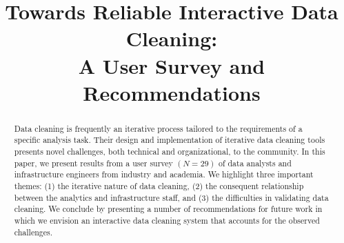 \documentclass{sig-alternate-05-2015}
\begin{document}
\newtheorem{theorem}{Theorem}
\newtheorem{example}{Example}
\newtheorem{definition}{Definition}
\newtheorem{problem}{Problem}
\newtheorem{property}{Property}
\newtheorem{proposition}{Proposition}
\newtheorem{lemma}{Lemma}
\newtheorem{corollary}{Corollary}



\title{Towards Reliable Interactive Data Cleaning: \\ A User Survey and Recommendations}


\maketitle

\begin{abstract}
Data cleaning is frequently an iterative process tailored to the requirements of a specific analysis task.
Their design and implementation of iterative data cleaning tools presents novel challenges, both technical and organizational, to the community.
In this paper, we present results from a user survey $(N=29)$ of data analysts and infrastructure engineers from industry and academia. We highlight three important themes: (1) the iterative nature of data cleaning, (2) the consequent relationship between the analytics and infrastructure staff, and (3) the difficulties in validating data cleaning.
We conclude by presenting a number of recommendations for future work in which we envision an interactive data cleaning system that accounts for the observed challenges.
\end{abstract}








 
\clearpage
\normalsize \selectfont
\end{document}
